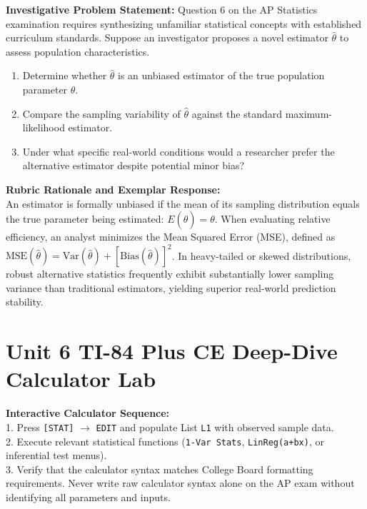 \begin{frqrubricbox}
\textbf{Investigative Problem Statement:} Question 6 on the AP Statistics examination requires synthesizing unfamiliar statistical concepts with established curriculum standards. Suppose an investigator proposes a novel estimator $\hat{\theta}$ to assess population characteristics.
\begin{enumerate}[label=(\alph*)]
  \item Determine whether $\hat{\theta}$ is an unbiased estimator of the true population parameter $\theta$.
  \item Compare the sampling variability of $\hat{\theta}$ against the standard maximum-likelihood estimator.
  \item Under what specific real-world conditions would a researcher prefer the alternative estimator despite potential minor bias?
\end{enumerate}
\textbf{Rubric Rationale and Exemplar Response:}\\
An estimator is formally unbiased if the mean of its sampling distribution equals the true parameter being estimated: $E(\hat{\theta}) = \theta$. When evaluating relative efficiency, an analyst minimizes the Mean Squared Error (MSE), defined as $\text{MSE}(\hat{\theta}) = \text{Var}(\hat{\theta}) + [\text{Bias}(\hat{\theta})]^2$. In heavy-tailed or skewed distributions, robust alternative statistics frequently exhibit substantially lower sampling variance than traditional estimators, yielding superior real-world prediction stability.
\end{frqrubricbox}\vspace{6pt}
\section{Unit 6 TI-84 Plus CE Deep-Dive Calculator Lab}
\begin{calculatorbox}
\textbf{Interactive Calculator Sequence:}\\
1. Press \texttt{[STAT]} $\rightarrow$ \texttt{EDIT} and populate List \texttt{L1} with observed sample data.\\
2. Execute relevant statistical functions (\texttt{1-Var Stats}, \texttt{LinReg(a+bx)}, or inferential test menus).\\
3. Verify that the calculator syntax matches College Board formatting requirements. Never write raw calculator syntax alone on the AP exam without identifying all parameters and inputs.
\end{calculatorbox}\vspace{10pt}
